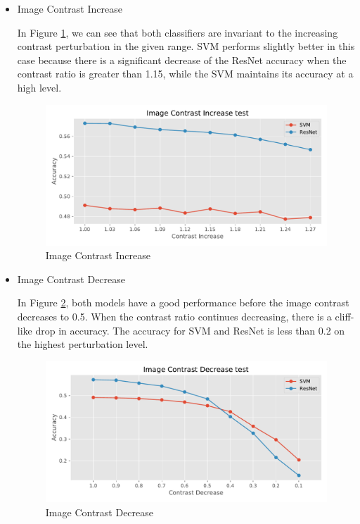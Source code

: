 \documentclass{article}
\begin{document}
\begin{itemize}
    \item Image Contrast Increase
    
    In Figure \ref{fig:ici}, we can see that both classifiers are invariant to the increasing contrast perturbation in the given range. SVM performs slightly better in this case because there is a significant decrease of the ResNet accuracy when the contrast ratio is greater than 1.15, while the SVM maintains its accuracy at a high level.
    
    \begin{figure}[H]
    \centering
    \includegraphics[width=\columnwidth]{figures/Image_Contrast_Increase.pdf}
    \caption{Image Contrast Increase}
    \label{fig:ici}
    \end{figure}
    
    
    \item Image Contrast Decrease
    
    In Figure \ref{fig:icd}, both models have a good performance before the image contrast decreases to 0.5. When the contrast ratio continues decreasing, there is a cliff-like drop in accuracy. The accuracy for SVM and ResNet is less than 0.2 on the highest perturbation level.
    
    \begin{figure}[H]
    \centering
    \includegraphics[width=\columnwidth]{figures/Image_Contrast_Decrease.pdf}
    \caption{Image Contrast Decrease}
    \label{fig:icd}
    \end{figure}
    


\end{itemize}
\end{document}
